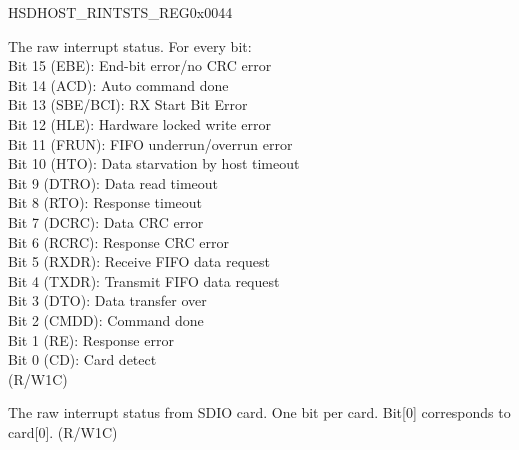 \begin{register}{H}{SDHOST\_RINTSTS\_REG}{0x0044}\label{regdesc:SDHOSTRINTSTSREG}
%
%
%
\regnewline%
\begin{regdesc}\begin{reglist}
\label{fielddesc:SDHOSTINTSTATUSRAW}\item [SDHOST\_INT\_STATUS\_RAW] The raw interrupt status. For every bit:\\
Bit 15 (EBE): End-bit error/no CRC error\\
Bit 14 (ACD): Auto command done\\
Bit 13 (SBE/BCI): RX Start Bit Error\\
Bit 12 (HLE): Hardware locked write error\\
Bit 11 (FRUN): FIFO underrun/overrun error\\
Bit 10 (HTO): Data starvation by host timeout\\
Bit 9 (DTRO): Data read timeout\\
Bit 8 (RTO): Response timeout\\
Bit 7 (DCRC): Data CRC error\\
Bit 6 (RCRC): Response CRC error\\
Bit 5 (RXDR): Receive FIFO data request\\
Bit 4 (TXDR): Transmit FIFO data request\\
Bit 3 (DTO): Data transfer over\\
Bit 2 (CMDD): Command done\\
Bit 1 (RE): Response error\\
Bit 0 (CD): Card detect\\ (R/W1C)
\label{fielddesc:SDHOSTSDIOINTERRUPTRAW}\item [SDHOST\_SDIO\_INTERRUPT\_RAW] The raw interrupt status from SDIO card. One bit per card. Bit[0] corresponds to card[0]. (R/W1C)
\end{reglist}\end{regdesc}
\end{register}



